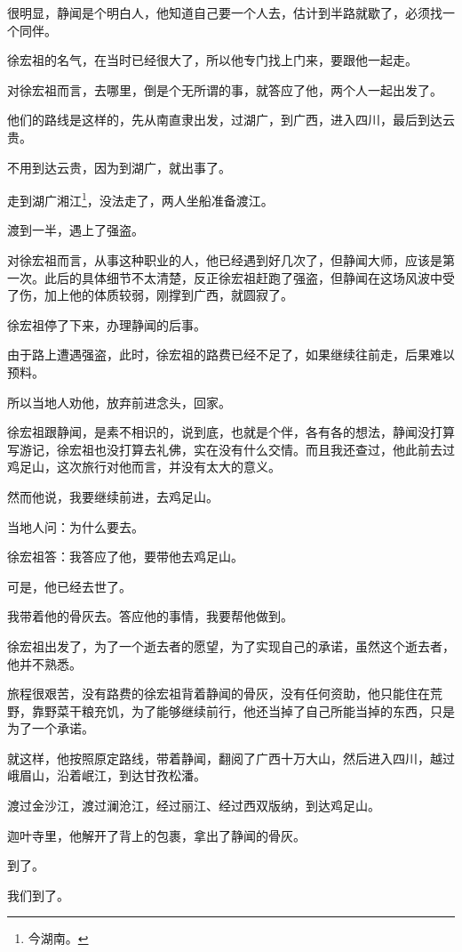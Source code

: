 \begin{multicols}{\theparacolNo}
		很明显，静闻是个明白人，他知道自己要一个人去，估计到半路就歇了，必须找一个同伴。

		徐宏祖的名气，在当时已经很大了，所以他专门找上门来，要跟他一起走。

		对徐宏祖而言，去哪里，倒是个无所谓的事，就答应了他，两个人一起出发了。

		他们的路线是这样的，先从南直隶出发，过湖广，到广西，进入四川，最后到达云贵。

		不用到达云贵，因为到湖广，就出事了。

		走到湖广湘江\footnote{今湖南。}，没法走了，两人坐船准备渡江。

		渡到一半，遇上了强盗。

		对徐宏祖而言，从事这种职业的人，他已经遇到好几次了，但静闻大师，应该是第一次。此后的具体细节不太清楚，反正徐宏祖赶跑了强盗，但静闻在这场风波中受了伤，加上他的体质较弱，刚撑到广西，就圆寂了。

		徐宏祖停了下来，办理静闻的后事。

		由于路上遭遇强盗，此时，徐宏祖的路费已经不足了，如果继续往前走，后果难以预料。

		所以当地人劝他，放弃前进念头，回家。

		徐宏祖跟静闻，是素不相识的，说到底，也就是个伴，各有各的想法，静闻没打算写游记，徐宏祖也没打算去礼佛，实在没有什么交情。而且我还查过，他此前去过鸡足山，这次旅行对他而言，并没有太大的意义。

		然而他说，我要继续前进，去鸡足山。

		当地人问：为什么要去。

		徐宏祖答：我答应了他，要带他去鸡足山。

		可是，他已经去世了。

		我带着他的骨灰去。答应他的事情，我要帮他做到。

		徐宏祖出发了，为了一个逝去者的愿望，为了实现自己的承诺，虽然这个逝去者，他并不熟悉。

		旅程很艰苦，没有路费的徐宏祖背着静闻的骨灰，没有任何资助，他只能住在荒野，靠野菜干粮充饥，为了能够继续前行，他还当掉了自己所能当掉的东西，只是为了一个承诺。

		就这样，他按照原定路线，带着静闻，翻阅了广西十万大山，然后进入四川，越过峨眉山，沿着岷江，到达甘孜松潘。

		渡过金沙江，渡过澜沧江，经过丽江、经过西双版纳，到达鸡足山。

		迦叶寺里，他解开了背上的包裹，拿出了静闻的骨灰。

		到了。

		我们到了。


\end{multicols}

